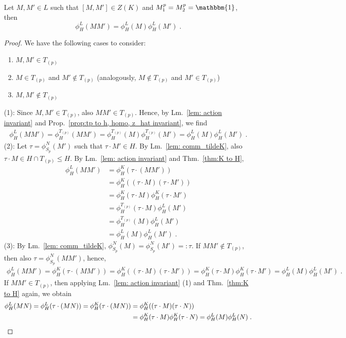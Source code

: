 \documentclass[10pt,a4paper]{amsart}
\newcommand{\one}{\mathbbm{1}}
\begin{document}
\begin{theorem}{\label{thm: main L to H}}
    Let $M,M'\in L$ such that $[M,M']\in Z(K)$ and $M^p_1=M^p_2=\one$, then
    $$\phi^L_H(MM')=\phi^L_H(M)\phi^L_H(M')\; .$$
\end{theorem}

\begin{proof}
    We have the following cases to consider:
    \begin{enumerate}
    \item $M,M'\in T_{(p)}$
    \item $M\in T_{(p)}$ and $M'\not\in T_{(p)}$ (analogously, $M\not\in T_{(p)}$ and $M'\in T_{(p)}$)
    \item $M,M'\not\in T_{(p)}$
    \end{enumerate}
    (1): Since $M,M'\in T_{(p)}$, also $MM'\in T_{(p)}$. Hence, by Lm.~\ref{lem: action invariant} and Prop.~\ref{prop:tp to h, homo, z_hat invariant}, we find
    \begin{align*}
        \phi^L_H(MM')
        =\phi^{T_{(p)}}_H(MM')
        =\phi^{T_{(p)}}_H(M)\phi^{T_{(p)}}_H(M')
        =\phi^L_H(M)\phi^L_H(M')\; .
    \end{align*}
    (2): Let $\tau=\phi^N_{S_p}(M')$ such that $\tau\cdot M'\in H$. By Lm.~\ref{lem: comm_tildeK}, also $\tau\cdot M\in H\cap T_{(p)}\leq H$. By Lm.~\ref{lem: action invariant} and Thm.~\ref{thm:K to H},
    \begin{align*}
        \phi^L_H(MM')
        &=\phi^K_H(\tau\cdot (MM'))\\
        &=\phi^K_H((\tau\cdot M)(\tau\cdot M'))\\
        &=\phi^K_H(\tau\cdot M)\phi^K_H(\tau\cdot M')\\
        &=\phi^{T_{(p)}}_H(\tau\cdot M)\phi^L_H(M')\\
        &=\phi^{T_{(p)}}_H(M)\phi^L_H(M')\\
        &=\phi^L_H(M)\phi^L_H(M')\; .
    \end{align*}
    (3): By Lm.~\ref{lem: comm_tildeK}, $\phi^N_{S_p}(M)=\phi^N_{S_p}(M')=:\tau$. If $MM'\not\in T_{(p)}$, then also $\tau=\phi^N_{S_p}(MM')$, hence,
    \begin{align*}
        \phi^L_H(MM')
        =\phi^K_H(\tau\cdot(MM'))=\phi^K_H((\tau\cdot M)(\tau\cdot M'))
        =\phi^K_H(\tau\cdot M)\phi^K_H(\tau\cdot M')
        =\phi^L_H(M)\phi^L_H(M')\; .
    \end{align*}
    If $MM'\in T_{(p)}$, then applying Lm.~\ref{lem: action invariant} (1) and Thm.~\ref{thm:K to H} again, we obtain
    \begin{align*}
        \phi^L_H(MN)
        =\phi^L_H(\tau\cdot (MN))
        =\phi^K_H(\tau\cdot (MN))
        &=\phi^K_H((\tau\cdot M)(\tau\cdot N))\\
        &=\phi^K_H(\tau\cdot M)\phi^K_H(\tau\cdot N)
        =\phi^L_H(M)\phi^L_H(N)\; .\qedhere
    \end{align*}
\end{proof}
\end{document}
